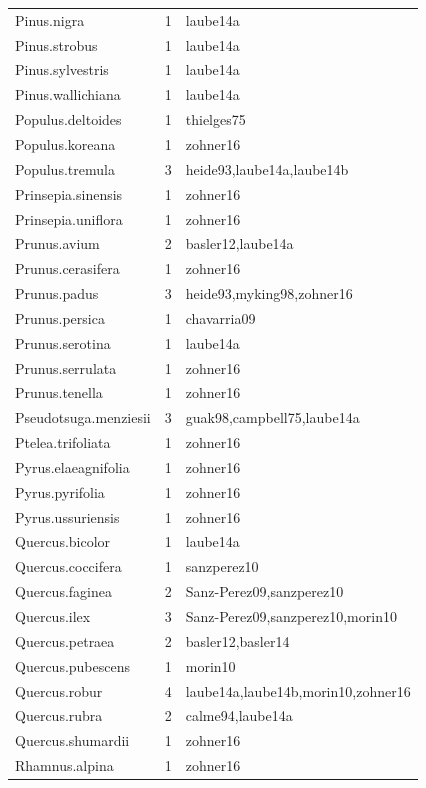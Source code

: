 \documentclass{article}
\begin{document}
\begin{footnotesize}
\begin{table}[ht]
\begin{tabular}{|p{}|p{}|p{}|}
  Pinus.nigra &   1 & laube14a \\ 
  Pinus.strobus &   1 & laube14a \\ 
  Pinus.sylvestris &   1 & laube14a \\ 
  Pinus.wallichiana &   1 & laube14a \\ 
  Populus.deltoides &   1 & thielges75 \\ 
  Populus.koreana &   1 & zohner16 \\ 
  Populus.tremula &   3 & heide93,laube14a,laube14b \\ 
  Prinsepia.sinensis &   1 & zohner16 \\ 
  Prinsepia.uniflora &   1 & zohner16 \\ 
  Prunus.avium &   2 & basler12,laube14a \\ 
  Prunus.cerasifera &   1 & zohner16 \\ 
  Prunus.padus &   3 & heide93,myking98,zohner16 \\ 
  Prunus.persica &   1 & chavarria09 \\ 
  Prunus.serotina &   1 & laube14a \\ 
  Prunus.serrulata &   1 & zohner16 \\ 
  Prunus.tenella &   1 & zohner16 \\ 
  Pseudotsuga.menziesii &   3 & guak98,campbell75,laube14a \\ 
  Ptelea.trifoliata &   1 & zohner16 \\ 
  Pyrus.elaeagnifolia &   1 & zohner16 \\ 
  Pyrus.pyrifolia &   1 & zohner16 \\ 
  Pyrus.ussuriensis &   1 & zohner16 \\ 
  Quercus.bicolor &   1 & laube14a \\ 
  Quercus.coccifera &   1 & sanzperez10 \\ 
  Quercus.faginea &   2 & Sanz-Perez09,sanzperez10 \\ 
  Quercus.ilex &   3 & Sanz-Perez09,sanzperez10,morin10 \\ 
  Quercus.petraea &   2 & basler12,basler14 \\ 
  Quercus.pubescens &   1 & morin10 \\ 
  Quercus.robur &   4 & laube14a,laube14b,morin10,zohner16 \\ 
  Quercus.rubra &   2 & calme94,laube14a \\ 
  Quercus.shumardii &   1 & zohner16 \\ 
  Rhamnus.alpina &   1 & zohner16 \\ 

\end{tabular}
\end{table}
\end{footnotesize}
\end{document}
